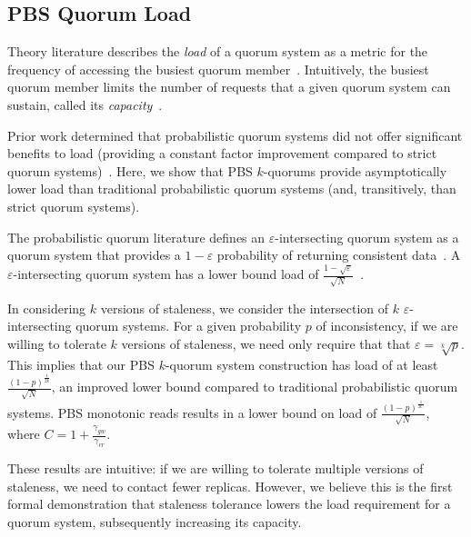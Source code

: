 \documentclass{vldb}
\begin{document}
\begin{appendix}
\section{PBS Quorum Load}
Theory literature describes the \textit{load} of a quorum system as a
metric for the frequency of accessing the busiest quorum
member~\cite[Definition 3.2]{quorumsystems}.  Intuitively, the busiest
quorum member limits the number of requests that a given quorum system
can sustain, called its \textit{capacity}~\cite[Corollary
  3.9]{quorumsystems}.

Prior work determined that probabilistic quorum systems did not offer
significant benefits to load (providing a constant factor improvement
compared to strict quorum systems)~\cite{prob-quorum}.  Here, we show
that PBS $k$-quorums provide asymptotically lower load than
traditional probabilistic quorum systems (and, transitively, than
strict quorum systems).

The probabilistic quorum literature defines an
$\varepsilon$-intersecting quorum system as a quorum system that
provides a $1-\varepsilon$ probability of returning consistent
data~\cite[Definition 3.1]{prob-quorum}.  A $\varepsilon$-intersecting
quorum system has a lower bound load of
$\frac{1-\sqrt{\varepsilon}}{\sqrt{N}}$~\cite[Corollary
  3.12]{prob-quorum}.

In considering $k$ versions of staleness, we consider the intersection
of $k$ $\varepsilon$-intersecting quorum systems.  For a given
probability $p$ of inconsistency, if we are willing to tolerate $k$
versions of staleness, we need only require that that $\varepsilon =
\sqrt[k]{p}$.  This implies that our PBS $k$-quorum system
construction has load of at least
$\frac{(1-p)^{\frac{1}{2k}}}{\sqrt{N}}$, an improved lower bound
compared to traditional probabilistic quorum systems.  PBS monotonic
reads results in a lower bound on load of
$\frac{(1-p)^{\frac{1}{2C}}}{\sqrt{N}}$, where
$C=1+\frac{\gamma_{gw}}{\gamma_{cr}}$.

These results are intuitive: if we are willing to tolerate multiple
versions of staleness, we need to contact fewer replicas.  However, we
believe this is the first formal demonstration that staleness
tolerance lowers the load requirement for a quorum system,
subsequently increasing its capacity.


\end{appendix}
\end{document}
